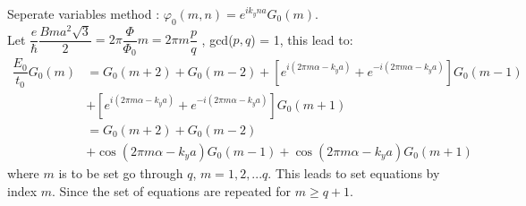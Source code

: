 \documentclass{report}
\newcommand{\f}[2]{\dfrac{#1}{#2}}
\begin{document}
Seperate variables method : $\varphi_{0} (m,n) = e^{i k_y n a}G_{0}(m)$.\\
Let $\dfrac{e}{\hbar}\dfrac{Bma^2\sqrt{3}}{2} = 2\pi\f{\Phi}{\Phi_0}m = 2\pi m \f{p}{q}$ , gcd($p,q$) = 1, this lead to:
\begin{align*}
	\f{E_{0}}{t_0}G_{0}(m)
	 & = G_{0}(m+2) + G_{0}(m-2)  + \left[e^{i(2\pi m \alpha - k_y a)} + e^{-i(2\pi m \alpha - k_y a)}\right] G_{0}(m-1)         \\
	 & + \left[e^{i(2\pi m \alpha - k_y a)} + e^{-i(2\pi m \alpha - k_y a)}\right] G_{0}(m+1)                                    \\
	 & = G_{0}(m+2) + G_{0}(m-2)                                                                                                 \\
	 & + \cos \left( 2\pi m \alpha - k_y a \right) G_{0}(m - 1) + \cos \left( 2\pi m \alpha - k_y a \right) G_{0}(m + 1) \tag{3}
\end{align*}
where $m$ is to be set go through $q$, $m = 1,2,... q$. This leads to set equations by index $m$. Since the set of equations are repeated for $m \geq q + 1$.
\end{document}
